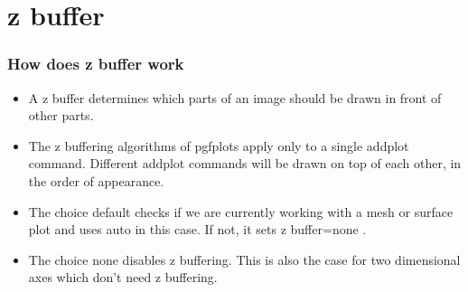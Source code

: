 \documentclass{beamer}
\begin{document}
\section{z buffer}
\begin{frame}[fragile]
\frametitle{How does z buffer work}
\begin{itemize}
\item A z buffer determines which parts of an image should be drawn in front of other parts.
\item The z buffering algorithms of pgfplots apply only to a single \color{blue}addplot \color{black}command. Different \color{blue} addplot \color{black} commands will be drawn on top of each other, in the order of appearance.
\item The choice \color{blue} default \color{black} checks if we are currently working with a mesh or surface plot and uses \color{blue} auto \color{black} in this case. If not, it sets \color{blue} z buffer=none \color{black}.
\item The choice \color{blue} none \color{black} disables z buffering. This is also the case for two dimensional axes which don't need z buffering.
\end{itemize}
\end{frame}
\end{document}
